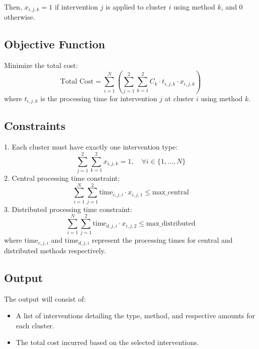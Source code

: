 \documentclass{article}
\begin{document}
Then, \( x_{i,j,k} = 1 \) if intervention \( j \) is applied to cluster \( i \) using method \( k \), and \( 0 \) otherwise.

\subsection*{Objective Function}
Minimize the total cost:
\[
\text{Total Cost} = \sum_{i=1}^{N} \left( \sum_{j=1}^{2} \sum_{k=1}^{2} C_k \cdot t_{i,j,k} \cdot x_{i,j,k} \right)
\] 
where \( t_{i,j,k} \) is the processing time for intervention \( j \) at cluster \( i \) using method \( k \).

\subsection*{Constraints}
1. Each cluster must have exactly one intervention type:
\[
\sum_{j=1}^{2} \sum_{k=1}^{2} x_{i,j,k} = 1, \quad \forall i \in \{1, \ldots, N\}
\]
2. Central processing time constraint:
\[
\sum_{i=1}^{N} \sum_{j=1}^{2} \text{time}_{c,j,i} \cdot x_{i,j,1} \leq \text{max\_central}
\]
3. Distributed processing time constraint:
\[
\sum_{i=1}^{N} \sum_{j=1}^{2} \text{time}_{d,j,i} \cdot x_{i,j,2} \leq \text{max\_distributed}
\]
where \( \text{time}_{c,j,i} \) and \( \text{time}_{d,j,i} \) represent the processing times for central and distributed methods respectively.

\subsection*{Output}
The output will consist of:
\begin{itemize}
    \item A list of interventions detailing the type, method, and respective amounts for each cluster.
    \item The total cost incurred based on the selected interventions.
\end{itemize}
\end{document}
